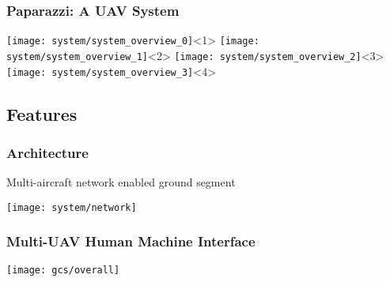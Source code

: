 
\begin{frame}
  \frametitle{Paparazzi: A UAV System}

  \begin{center}
    \texttt{[image: system/system\_overview\_0]}<1>
    \texttt{[image: system/system\_overview\_1]}<2>
    \texttt{[image: system/system\_overview\_2]}<3>
    \texttt{[image: system/system\_overview\_3]}<4>
  \end{center}
\end{frame}

%
%
\subsection{Features}



%
\begin{frame}
\frametitle{Architecture}
\begin{center}
Multi-aircraft network enabled ground segment
\end{center}
\begin{center}
\texttt{[image: system/network]}
\end{center}
\end{frame}




%
\begin{frame}
  \frametitle{Multi-UAV Human Machine Interface}

  \begin{center}
    \texttt{[image: gcs/overall]}
  \end{center}
\end{frame}






